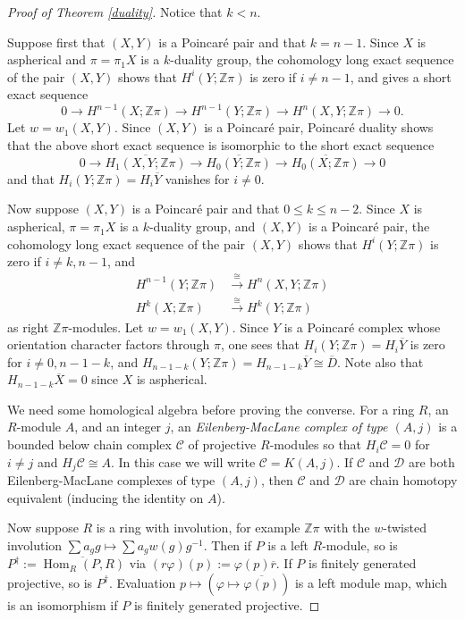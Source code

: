 \documentclass[12pt]{amsart}
\theoremstyle{definition}
\newcommand{\Z}{\mathbb Z}
\DeclareMathOperator{\Hom}{Hom}
\newcommand{\ol}[1]{{\overline{#1}}}
\newcommand{\cC}{\mathcal C}
\newcommand{\cD}{\mathcal D}
\begin{document}
\begin{proof}[Proof of Theorem \ref{duality}]
 Notice  that $k < n$.  

Suppose first that $(X,Y)$ is a Poincar\'e pair and that $k = n-1$.    Since $X$ is aspherical and $\pi = \pi_1X$ is a  $k$-duality group, the cohomology long exact sequence of the pair $(X,Y)$ shows that $H^i(Y;\Z\pi)$ is zero if $i \not =  n-1$, and gives a short exact sequence
\begin{equation*}
0 \to H^{n-1}(X;\Z\pi)   \to H^{n-1}(Y;\Z\pi)   \to H^{n}(X,Y;\Z\pi)   \to  0.
\end{equation*}
Let $w = w_1(X,Y)$.  Since $(X,Y)$ is a Poincar\'e pair, Poincar\'e duality shows that the above short exact sequence is isomorphic to the short exact sequence 
$$
0 \to \ol{H_{1}(X,Y;\Z\pi)} \to \ol {H_{0}(Y;\Z\pi)}  \to \ol{H_{0}(X;\Z\pi)}  \to 0
$$
and that $H_i(Y;\Z\pi) = H_i\ol Y$ vanishes for $i \not = 0$.

Now suppose $(X,Y)$ is a Poincar\'e pair and that $0 \leq k \leq n-2$. 
Since $X$ is aspherical, $\pi = \pi_1X$ is a  $k$-duality group, and $(X,Y)$ is a Poincar\'e pair, the cohomology long exact sequence of the pair $(X,Y)$ shows that $H^i(Y;\Z\pi)$ is zero if $i \not = k, n-1$, and
\begin{align*}
 H^{n-1}(Y;\Z\pi) & \xrightarrow{\cong} H^n(X,Y;\Z\pi) \\
  H^{k}(X;\Z\pi) & \xrightarrow{\cong} H^k(Y;\Z\pi)
\end{align*}
as right $\Z\pi$-modules.  Let $w = w_1(X,Y)$.  Since $Y$ is a Poincar\'e complex whose orientation character factors through $\pi$,
one sees that $H_i(Y;\Z\pi)= H_i\ol Y$ is zero for $i \not = 0, n-1-k$, and $H_{n-1-k}(Y;\Z\pi) = H_{n-1-k}\ol Y \cong \ol D$.  Note also that $H_{n-1-k}\ol X = 0$ since $X$ is aspherical.

We need some homological algebra before proving the converse.   
For a ring $R$, an $R$-module $A$, and an integer $j$, an {\em Eilenberg-MacLane complex of type $(A,j)$} is a bounded below  chain complex $\cC$ of projective $R$-modules so that $H_i\cC = 0$ for $i \not = j$ and $H_j\cC \cong A$.  In this case we will write $\cC = K(A,j)$.   If $\cC$ and $\cD$ are both Eilenberg-MacLane complexes of type $(A,j)$, then $\cC$ and $\cD$ are chain homotopy equivalent (inducing the identity on $A$).

Now suppose $R$ is a ring with involution, for example $\Z\pi$ with the $w$-twisted involution $\sum a_g g \mapsto \sum a_g w(g) g^{-1}$.  Then if $P$ is a left $R$-module, so is $P^\dagger := \ol{\Hom_R(P,R)}$ via $(r\varphi)(p) := \varphi(p)\ol r$.  If $P$ is finitely generated projective, so is $P^\dagger$.   Evaluation $p\mapsto (\varphi \mapsto \ol{\varphi(p)})$ is a left module map, which is an isomorphism if $P$ is finitely generated projective.  


\end{proof}
\end{document}
